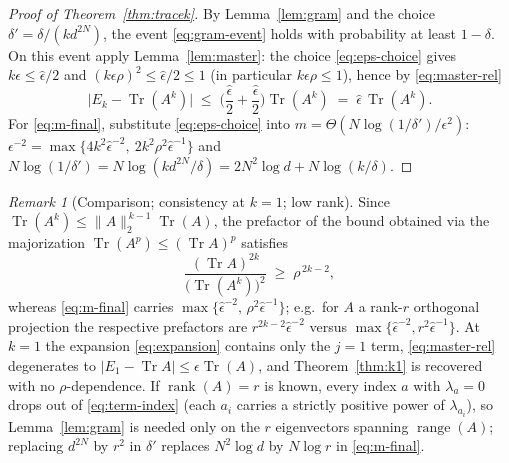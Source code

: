 \documentclass{article}
\theoremstyle{remark}
\newtheorem{remark}[theorem]{Remark}
\begin{document}
\begin{proof}[Proof of Theorem~\ref{thm:tracek}]
By Lemma~\ref{lem:gram} and the choice $\delta' = \delta/(k d^{2N})$, the event \eqref{eq:gram-event} holds with probability at least $1-\delta$. On this event apply Lemma~\ref{lem:master}: the choice \eqref{eq:eps-choice} gives $k\epsilon \le \hat\epsilon/2$ and $(k\epsilon\rho)^2 \le \hat\epsilon/2 \le 1$ (in particular $k\epsilon\rho \le 1$), hence by \eqref{eq:master-rel}
\begin{equation}
\big| E_k - \operatorname{Tr}(A^k) \big| \;\le\; \Big( \frac{\hat\epsilon}{2} + \frac{\hat\epsilon}{2} \Big) \operatorname{Tr}(A^k) \;=\; \hat\epsilon\, \operatorname{Tr}(A^k).
\end{equation}
For \eqref{eq:m-final}, substitute \eqref{eq:eps-choice} into $m = \Theta(N\log(1/\delta')/\epsilon^2)$:
$\epsilon^{-2} = \max\{ 4k^2 \hat\epsilon^{-2},\ 2k^2 \rho^2 \hat\epsilon^{-1} \}$ and $N\log(1/\delta') = N\log(k d^{2N}/\delta) = 2N^2\log d + N\log(k/\delta)$.
\end{proof}

\begin{remark}[Comparison; consistency at $k=1$; low rank]\label{rem:comparison}
Since $\operatorname{Tr}(A^k) \le \|A\|_2^{\,k-1}\operatorname{Tr}(A)$, the prefactor of the bound obtained via the majorization $\operatorname{Tr}(A^p) \le (\operatorname{Tr} A)^p$ satisfies
\begin{equation}
\frac{(\operatorname{Tr} A)^{2k}}{\big(\operatorname{Tr}(A^k)\big)^2} \;\ge\; \rho^{\,2k-2},
\end{equation}
whereas \eqref{eq:m-final} carries $\max\{\hat\epsilon^{-2},\, \rho^2 \hat\epsilon^{-1}\}$; e.g.\ for $A$ a rank-$r$ orthogonal projection the respective prefactors are $r^{2k-2}\hat\epsilon^{-2}$ versus $\max\{\hat\epsilon^{-2}, r^{2}\hat\epsilon^{-1}\}$. At $k=1$ the expansion \eqref{eq:expansion} contains only the $j=1$ term, \eqref{eq:master-rel} degenerates to $|E_1 - \operatorname{Tr} A| \le \epsilon \operatorname{Tr}(A)$, and Theorem~\ref{thm:k1} is recovered with no $\rho$-dependence. If $\operatorname{rank}(A) = r$ is known, every index $a$ with $\lambda_a = 0$ drops out of \eqref{eq:term-index} (each $a_i$ carries a strictly positive power of $\lambda_{a_i}$), so Lemma~\ref{lem:gram} is needed only on the $r$ eigenvectors spanning $\operatorname{range}(A)$; replacing $d^{2N}$ by $r^2$ in $\delta'$ replaces $N^2 \log d$ by $N \log r$ in \eqref{eq:m-final}.
\end{remark}
\end{document}
